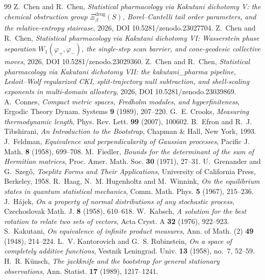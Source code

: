 \documentclass[11pt,reqno]{amsart}
\theoremstyle{plain}
\theoremstyle{definition}
\theoremstyle{remark}
\numberwithin{equation}{section}
\begin{document}
\begin{thebibliography}{99}
 Z.~Chen and R.~Chen, \emph{Statistical pharmacology via Kakutani dichotomy V: the chemical obstruction group $\Xi_\beta^{\mathrm{drug}}(S)$, Borel--Cantelli tail order parameters, and the relative-entropy staircase}, 2026, DOI 10.5281/zenodo.23027704.
 Z.~Chen and R.~Chen, \emph{Statistical pharmacology via Kakutani dichotomy VI: Wasserstein phase separation $W_1(\varphi_+,\varphi_-)$, the single-step scan barrier, and cone-geodesic collective moves}, 2026, DOI 10.5281/zenodo.23029360.
 Z.~Chen and R.~Chen, \emph{Statistical pharmacology via Kakutani dichotomy VII: the kakutani\_pharma pipeline, Ledoit--Wolf regularized CKI, split-trajectory null subtraction, and shell-scaling exponents in multi-domain allostery}, 2026, DOI 10.5281/zenodo.23039869.
 A.~Connes, \emph{Compact metric spaces, Fredholm modules, and hyperfiniteness}, Ergodic Theory Dynam. Systems \textbf{9} (1989), 207--220.
 G.~E. Crooks, \emph{Measuring thermodynamic length}, Phys. Rev. Lett. \textbf{99} (2007), 100602.
 B.~Efron and R.~J. Tibshirani, \emph{An Introduction to the Bootstrap}, Chapman \& Hall, New York, 1993.
 J.~Feldman, \emph{Equivalence and perpendicularity of Gaussian processes}, Pacific J. Math. \textbf{8} (1958), 699--708.
 M.~Fiedler, \emph{Bounds for the determinant of the sum of Hermitian matrices}, Proc. Amer. Math. Soc. \textbf{30} (1971), 27--31.
 U.~Grenander and G.~Szeg\H{o}, \emph{Toeplitz Forms and Their Applications}, University of California Press, Berkeley, 1958.
 R.~Haag, N.~M. Hugenholtz and M.~Winnink, \emph{On the equilibrium states in quantum statistical mechanics}, Comm. Math. Phys. \textbf{5} (1967), 215--236.
 J.~H\'ajek, \emph{On a property of normal distributions of any stochastic process}, Czechoslovak Math. J. \textbf{8} (1958), 610--618.
 W.~Kabsch, \emph{A solution for the best rotation to relate two sets of vectors}, Acta Cryst. A \textbf{32} (1976), 922--923.
 S.~Kakutani, \emph{On equivalence of infinite product measures}, Ann. of Math. (2) \textbf{49} (1948), 214--224.
 L.~V. Kantorovich and G.~S. Rubinstein, \emph{On a space of completely additive functions}, Vestnik Leningrad. Univ. \textbf{13} (1958), no.~7, 52--59.
 H.~R. K\"unsch, \emph{The jackknife and the bootstrap for general stationary observations}, Ann. Statist. \textbf{17} (1989), 1217--1241.

\end{thebibliography}
\end{document}
